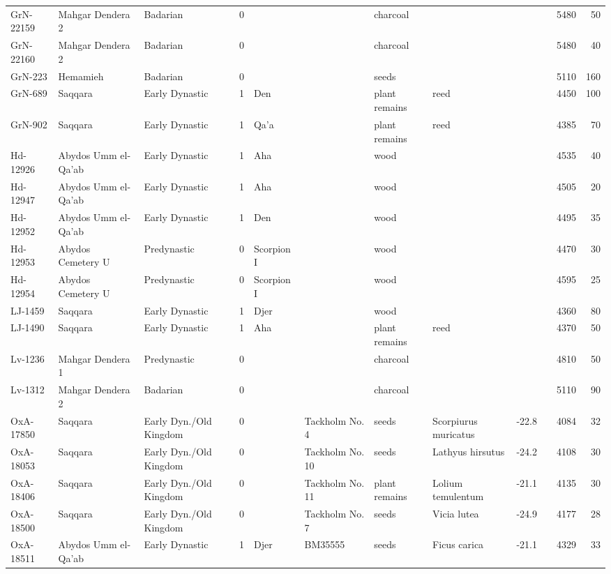 \documentclass[a4paper,8pt]{article}
\begin{document}
\begin{landscape}
\begin{center}
\begin{longtable}{|l|>{\raggedright}p{20ex}|l|r|l|>{\raggedright}p{25ex}|l|l|r|l|r|r|}
GrN-22159 & Mahgar Dendera 2 & Badarian & 0 &  &  & charcoal &  &   &  & 5480 & 50\\
GrN-22160 & Mahgar Dendera 2 & Badarian & 0 &  &  & charcoal &  &   &  & 5480 & 40\\
GrN-223 & Hemamieh & Badarian & 0 &  &  & seeds &  &   &  & 5110 & 160\\
GrN-689 & Saqqara & Early Dynastic & 1 & Den &  & plant remains & reed &   &  & 4450 & 100\\
GrN-902 & Saqqara & Early Dynastic & 1 & Qa'a &  & plant remains & reed &   &  & 4385 & 70\\
Hd-12926 & Abydos Umm el-Qa'ab & Early Dynastic & 1 & Aha &  & wood &  &   &  & 4535 & 40\\
Hd-12947 & Abydos Umm el-Qa'ab & Early Dynastic & 1 & Aha &  & wood &  &   &  & 4505 & 20\\
Hd-12952 & Abydos Umm el-Qa'ab & Early Dynastic & 1 & Den &  & wood &  &   &  & 4495 & 35\\
Hd-12953 & Abydos Cemetery U & Predynastic & 0 & Scorpion I &  & wood &  &   &  & 4470 & 30\\
Hd-12954 & Abydos Cemetery U & Predynastic & 0 & Scorpion I &  & wood &  &   &  & 4595 & 25\\
LJ-1459 & Saqqara & Early Dynastic & 1 & Djer &  & wood &  &   &  & 4360 & 80\\
LJ-1490 & Saqqara & Early Dynastic & 1 & Aha &  & plant remains & reed &   &  & 4370 & 50\\
Lv-1236 & Mahgar Dendera 1 & Predynastic & 0 &  &  & charcoal &  &   &  & 4810 & 50\\
Lv-1312 & Mahgar Dendera 2 & Badarian & 0 &  &  & charcoal &  &   &  & 5110 & 90\\
OxA-17850 & Saqqara & Early Dyn./\-Old Kingdom & 0 &  & Tackholm No. 4 & seeds & Scorpiurus muricatus & -22.8 &  & 4084 & 32\\
OxA-18053 & Saqqara & Early Dyn./\-Old Kingdom & 0 &  & Tackholm No. 10 & seeds & Lathyus hirsutus & -24.2 &  & 4108 & 30\\
OxA-18406 & Saqqara & Early Dyn./\-Old Kingdom & 0 &  & Tackholm No. 11 & plant remains & Lolium temulentum & -21.1 &  & 4135 & 30\\
OxA-18500 & Saqqara & Early Dyn./\-Old Kingdom & 0 &  & Tackholm No. 7 & seeds & Vicia lutea & -24.9 &  & 4177 & 28\\
OxA-18511 & Abydos Umm el-Qa'ab & Early Dynastic & 1 & Djer & BM35555 & seeds & Ficus carica & -21.1 &  & 4329 & 33\\

\end{longtable}
\end{center}
\end{landscape}
\end{document}
